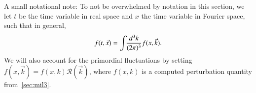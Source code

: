 







A small notational note: To not be overwhelmed by notation in this section, we let $t$ be the time variable in real space and $x$ the time variable in Fourier space, such that in general,
\begin{equation}
    f(t, \vec{x}) = \int \!\! \frac{d^3 {k}}{(2\pi)^3} f(x, \vec{k}).
\end{equation}
We will also account for the primordial fluctuations by setting $f(x,\vec{k})= f(x, k) \mathcal{R}(\vec{k})$, where $f(x,k)$ is a computed perturbation quantity from~\cref{sec:mil3}.










